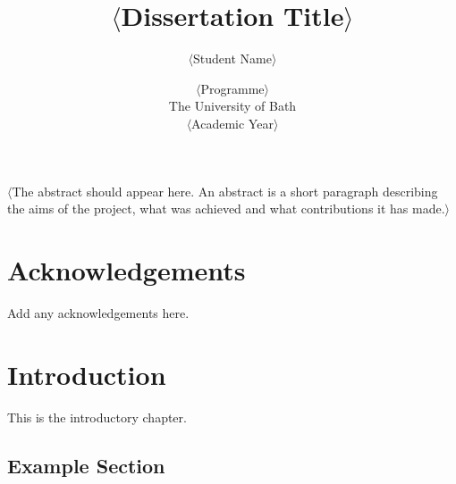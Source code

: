 \documentclass[12pt,a4paper]{report}
\title{\bf $\langle$Dissertation Title$\rangle$}
\author{$\langle$Student Name$\rangle$}
\date{$\langle$Programme$\rangle$\\ 
      The University of Bath\\
      $\langle$Academic Year$\rangle$}
\begin{document}
\hypersetup{pageanchor=false}

\lstset{language=Java,breaklines,breakatwhitespace,basicstyle=\small}

\setcounter{page}{0}

\maketitle
\newpage
%

\newpage

\hypersetup{pageanchor=true}

\abstract
$\langle$The abstract should appear here. An abstract is a short paragraph describing the aims of the project, what was achieved and what contributions it has made.$\rangle$
\newpage

\tableofcontents
\newpage

\listoffigures
\newpage

\listoftables
\newpage

\chapter*{Acknowledgements}

Add any acknowledgements here.

\newpage
\setcounter{page}{1}

\chapter{Introduction}

This is the introductory chapter.

\section{Example Section}
\end{document}
